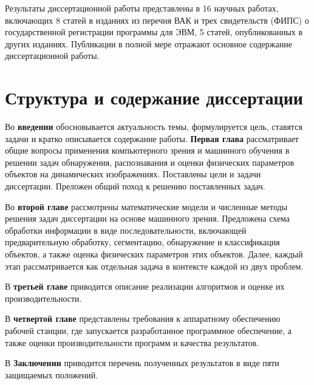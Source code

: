 \documentclass[12pt]{extarticle}
\begin{document}
Результаты диссертационной работы представлены в 16 научных работах, включающих 8 статей в изданиях из перечня ВАК и трех свидетельств (ФИПС) о государственной регистрации программы для ЭВМ, 5 статей, опубликованных в других изданиях.  Публикации в полной мере отражают основное содержание диссертационной работы.

\section{Структура и содержание диссертации}

Во \textbf{введении} обосновывается актуальность темы, формулируется цель, ставятся задачи и кратко описывается содержание работы. \textbf{Первая глава} рассматривает общие вопросы применения компьютерного зрения и машинного обучения в решении задач обнаружения, распознавания и оценки физических параметров объектов на динамических изображениях.  Поставлены цели и задачи диссертации. Преложен общий поход к решению поставленных задач.

Во \textbf{второй главе} рассмотрены математические модели и численные методы решения задач диссертации на основе машинного зрения.  Предложена схема обработки информации в виде последовательности, включающей предварительную обработку, сегментацию, обнаружение и классификация объектов, а также оценка физических параметров этих объектов.  Далее, каждый этап рассматривается как отдельная задача в контексте каждой из двух проблем.

В \textbf{третьей главе} приводится описание реализации алгоритмов и оценке их производительности.

В \textbf{четвертой главе} представлены требования к аппаратному обеспечению рабочей станции, где запускается разработанное программное обеспечение, а также оценки производительности программ и качества результатов.

В \textbf{Заключении} приводится перечень полученных результатов в виде пяти защищаемых положений.
\end{document}
